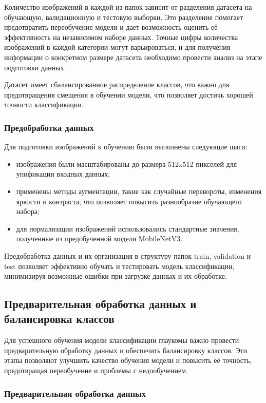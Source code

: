 {    Количество изображений в каждой из папок зависит от разделения датасета на обучающую, валидационную и тестовую выборки. Это разделение помогает предотвратить переобучение модели и дает возможность оценить её эффективность на независимом наборе данных. Точные цифры количества изображений в каждой категории могут варьироваться, и для получения информации о конкретном размере датасета необходимо провести анализ на этапе подготовки данных. 

    Датасет имеет сбалансированное распределение классов, что важно для предотвращения смещения в обучении модели, что позволяет достичь хорошей точности классификации.

    \subsubsection*{Предобработка данных}

    Для подготовки изображений к обучению были выполнены следующие шаги:
    \begin{itemize}
        \item изображения были масштабированы до размера 512x512 пикселей для унификации входных данных;
        \item применены методы аугментации, такие как случайные перевороты, изменения яркости и контраста, что позволяет повысить разнообразие обучающего набора;
        \item для нормализации изображений использовались стандартные значения, полученные из предобученной модели MobileNetV3.
    \end{itemize}

    Предобработка данных и их организация в структуру папок train,  validation и test позволяет эффективно обучать и тестировать модель классификации, минимизируя возможные ошибки при загрузке данных и их обработке.
    \vspace{13pt}
    \subsection{Предварительная обработка данных и балансировка классов}

    Для успешного обучения модели классификации глаукомы важно провести предварительную обработку данных и обеспечить балансировку классов. Эти этапы позволяют улучшить качество обучения модели и повысить её точность, предотвращая переобучение и проблемы с недообучением.
    
    \subsubsection*{Предварительная обработка данных}
    
}
